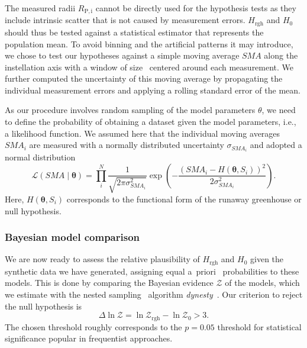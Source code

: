 \documentclass[modern]{aastex631}
\begin{document}
The measured radii $R_\mathrm{P, i}$ cannot be directly used for the hypothesis tests as they include intrinsic scatter that is not caused by measurement errors.
$H_{\mathrm{rgh}}$ and $H_0$ should thus be tested against a statistical estimator that represents the population mean.
To avoid binning and the artificial patterns it may introduce, we chose to test our hypotheses against a simple moving average $SMA$ along the instellation axis with a window of size \windowsize\ centered around each measurement.
We further computed the uncertainty of this moving average by propagating the individual measurement errors and applying a rolling standard error of the mean. 

As our procedure involves random sampling of the model parameters $\theta$, we need to define the probability of obtaining a dataset given the model parameters, i.e., a likelihood function.
We assumed here that the individual moving averages $SMA_i$ are measured with a normally distributed uncertainty $\sigma_{SMA_i}$ and adopted a normal distribution
\begin{equation}
    \mathcal{L}(SMA \mid \boldsymbol{\theta})=\prod_{i}^{N} \frac{1}{\sqrt{2 \pi \sigma_{SMA_i}^{2}}} \exp \left(-\frac{\left(SMA_i - H\left(\boldsymbol{\theta}, S_i\right)\right)^{2}}{2 \sigma_{SMA_i}^{2}}\right).
\end{equation}
Here, $H\left(\boldsymbol{\theta}, S_i\right)$ corresponds to the functional form of the runaway greenhouse or null hypothesis.



\subsubsection{Bayesian model comparison}
We are now ready to assess the relative plausibility of $H_{\mathrm{rgh}}$ and $H_0$ given the synthetic data we have generated, assigning equal a~priori~ probabilities to these models.
This is done by comparing the Bayesian evidence $\mathcal{Z}$ of the models, which we estimate with the nested sampling~\citep{Skilling2004} algorithm \emph{dynesty}~\citep{Speagle2020}.
Our criterion to reject the null hypothesis is
\begin{equation}
\Delta \ln \mathcal{Z}  = \ln \mathcal{Z}_\mathrm{rgh} - \ln \mathcal{Z}_0  > 3.
\end{equation}
The chosen threshold roughly corresponds to the $p = 0.05$ threshold for statistical significance popular in frequentist approaches.
\end{document}
